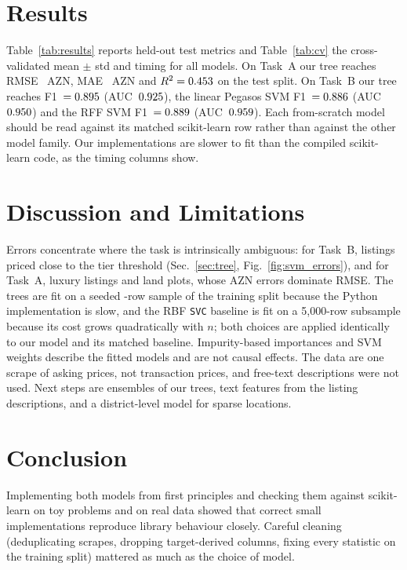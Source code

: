 \documentclass[10pt,twocolumn,a4paper]{article}
\begin{document}
\section{Results}
\label{sec:results}
Table~\ref{tab:results} reports held-out test metrics and
Table~\ref{tab:cv} the cross-validated mean $\pm$ std and timing for all
models. On Task~A our tree reaches RMSE \TreeRmse{}~AZN, MAE
\TreeMae{}~AZN and $R^2=0.453$ on the test split. On Task~B our tree
reaches F1~$=0.895$ (AUC~$0.925$), the linear Pegasos SVM
F1~$=0.886$ (AUC~$0.950$) and the RFF SVM F1~$=0.889$
(AUC~$0.959$). Each from-scratch model should be read against its
matched scikit-learn row rather than against the other model family. Our
implementations are slower to fit than the compiled scikit-learn code, as
the timing columns show.



\section{Discussion and Limitations}
Errors concentrate where the task is intrinsically ambiguous: for Task~B,
listings priced close to the tier threshold
(Sec.~\ref{sec:tree}, Fig.~\ref{fig:svm_errors}), and for Task~A, luxury
listings and land plots, whose AZN errors dominate RMSE. The trees are fit
on a seeded \TreeFitRows{}-row sample of the training split because the
Python implementation is slow, and the RBF \texttt{SVC} baseline is fit on
a 5{,}000-row subsample because its cost grows quadratically with $n$;
both choices are applied identically to our model and its matched
baseline. Impurity-based importances and SVM weights describe the fitted
models and are not causal effects. The data are one scrape of asking
prices, not transaction prices, and free-text descriptions were not used.
Next steps are ensembles of our trees, text features from the listing
descriptions, and a district-level model for sparse locations.

\section{Conclusion}
Implementing both models from first principles and checking them against
scikit-learn on toy problems and on real data showed that correct small
implementations reproduce library behaviour closely. Careful cleaning
(deduplicating scrapes, dropping target-derived columns, fixing every
statistic on the training split) mattered as much as the choice of model.
\end{document}
